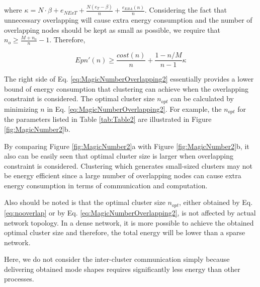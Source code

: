 where \(\kappa = N \cdot \beta + e_{NExT}+ \frac{N(e_T-\beta)}{n} + \frac{e_{ERA}(n)}{n}\).  Considering the fact that unnecessary overlapping will cause extra energy consumption and the number of overlapping nodes should be kept as small as possible, we require that \(n_o \geq \frac{M+n_o}{n} -1\). Therefore,

\begin{equation}
\label{eq:MagicNumberOverlapping2}
Epn'(n) \geq \frac{cost(n)}{n}+ \frac{1-n/M}{n-1}\kappa
\end{equation}

The right side of Eq. \ref{eq:MagicNumberOverlapping2} essentially provides a lower bound of energy consumption that clustering can achieve when the overlapping constraint is considered. The optimal cluster size \(n_{opt}\) can be calculated by minimizing \(n\) in Eq. \ref{eq:MagicNumberOverlapping2}.  For example, the \(n_{opt}\) for the parameters listed in Table \ref{tab:Table2} are illustrated in Figure \ref{fig:MagicNumber2}b. 

By comparing Figure \ref{fig:MagicNumber2}a with Figure \ref{fig:MagicNumber2}b, it also can be easily seen that optimal cluster size is larger when overlapping constraint is considered. Clustering which generates small-sized clusters may not be energy efficient since a large number of overlapping nodes can cause extra energy consumption in terms of communication and computation. 

Also should be noted is that the optimal cluster size \(n_{opt}\), either obtained by Eq. \ref{eq:nooverlap} or by Eq. \ref{eq:MagicNumberOverlapping2}, is not affected by actual network topology. In a dense network, it is more possible to achieve the obtained optimal cluster size and therefore, the total energy will be lower than a sparse network.

Here, we do not consider the inter-cluster communication simply because delivering obtained mode shapes requires significantly less energy than other processes.